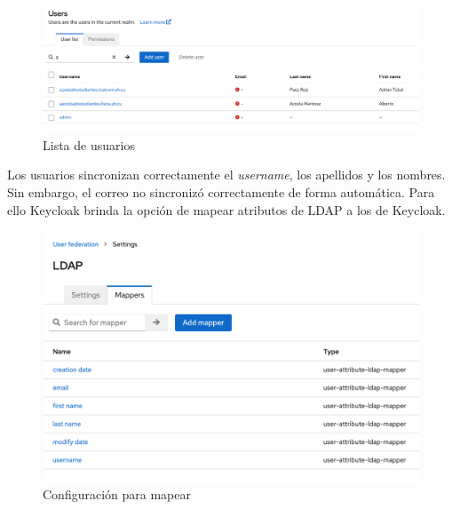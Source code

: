 \begin{enumerate}
	\begin{figure}[H]
		\centering
		\includegraphics[width=1\linewidth]{Graphics/users_not_mapped}
		\caption{Lista de usuarios }
		\label{fig:usersnotmapped}
	\end{figure}
	
	Los usuarios sincronizan correctamente el \textit{username}, los apellidos y los nombres. Sin embargo, el correo no sincronizó correctamente de forma automática. Para ello Keycloak brinda la opción de mapear atributos de LDAP a los de Keycloak. 
	
	\begin{figure}[H]
		\centering
		\includegraphics[width=1\linewidth]{Graphics/mappers}
		\caption{Configuración para mapear }
		\label{fig:mapper}
	\end{figure}


\end{enumerate}
